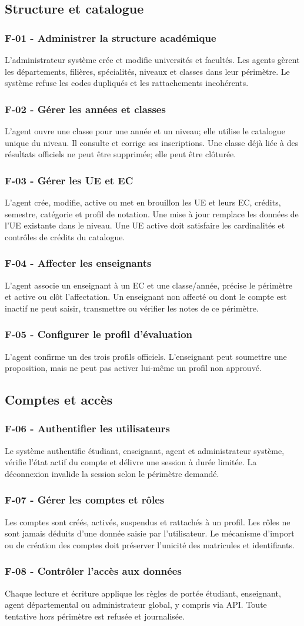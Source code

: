 \documentclass[11pt,a4paper]{article}
\newcommand{\req}[3]{\subsubsection*{#1 - #2}\noindent #3\par\medskip}
\begin{document}
\subsection{Structure et catalogue}
\req{F-01}{Administrer la structure académique}{L'administrateur système crée et modifie universités et facultés. Les agents gèrent les départements, filières, spécialités, niveaux et classes dans leur périmètre. Le système refuse les codes dupliqués et les rattachements incohérents.}
\req{F-02}{Gérer les années et classes}{L'agent ouvre une classe pour une année et un niveau; elle utilise le catalogue unique du niveau. Il consulte et corrige ses inscriptions. Une classe déjà liée à des résultats officiels ne peut être supprimée; elle peut être clôturée.}
\req{F-03}{Gérer les UE et EC}{L'agent crée, modifie, active ou met en brouillon les UE et leurs EC, crédits, semestre, catégorie et profil de notation. Une mise à jour remplace les données de l'UE existante dans le niveau. Une UE active doit satisfaire les cardinalités et contrôles de crédits du catalogue.}
\req{F-04}{Affecter les enseignants}{L'agent associe un enseignant à un EC et une classe/année, précise le périmètre et active ou clôt l'affectation. Un enseignant non affecté ou dont le compte est inactif ne peut saisir, transmettre ou vérifier les notes de ce périmètre.}
\req{F-05}{Configurer le profil d'évaluation}{L'agent confirme un des trois profils officiels. L'enseignant peut soumettre une proposition, mais ne peut pas activer lui-même un profil non approuvé.}

\subsection{Comptes et accès}
\req{F-06}{Authentifier les utilisateurs}{Le système authentifie étudiant, enseignant, agent et administrateur système, vérifie l'état actif du compte et délivre une session à durée limitée. La déconnexion invalide la session selon le périmètre demandé.}
\req{F-07}{Gérer les comptes et rôles}{Les comptes sont créés, activés, suspendus et rattachés à un profil. Les rôles ne sont jamais déduits d'une donnée saisie par l'utilisateur. Le mécanisme d'import ou de création des comptes doit préserver l'unicité des matricules et identifiants.}
\req{F-08}{Contrôler l'accès aux données}{Chaque lecture et écriture applique les règles de portée étudiant, enseignant, agent départemental ou administrateur global, y compris via API. Toute tentative hors périmètre est refusée et journalisée.}
\end{document}
